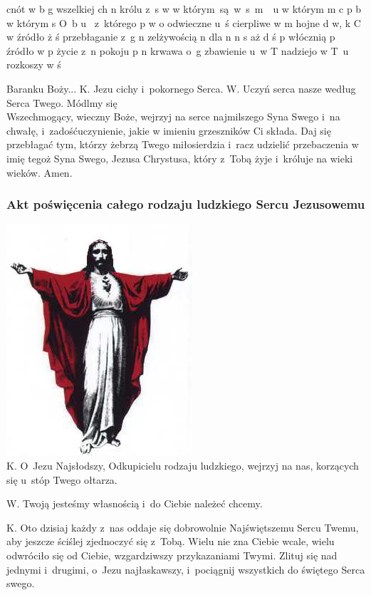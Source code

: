\documentclass[twocolumn,fleqn,oneside,openany,a5paper,12pt]{book}
\begin{document}
\sj cnót w b g
\sj wszelkiej ch n
\sj królu  z~s w
\sj w którym~są~w~s~m~~u
\sj w którym m c p b
\sj w którym s O~b u~
\sj z~którego p w o
\sj odwieczne u~ś
\sj cierpliwe  w m
\sj hojne d w, k C w
\sj źródło ż  ś
\sj przebłaganie z~g n
\sj zelżywością n
\sj dla n n s
\sj aż d ś p
\sj włócznią p
\sj źródło w p
\sj życie  z~n
\sj pokoju  p n
\sj krwawa o~g
\sj zbawienie u~w T
\sj nadziejo w T~u
\sj rozkoszy w ś
 
{\tiny Baranku Boży... 
K. Jezu cichy i~pokornego Serca.
W. Uczyń serca nasze według Serca Twego.}
\endgroup 
Módlmy się\\
Wszechmogący, wieczny Boże, wejrzyj na serce najmilszego Syna Swego i~na chwałę, i~zadośćuczynienie, jakie w imieniu grzeszników Ci składa. 
Daj się przebłagać tym, którzy żebrzą Twego miłosierdzia i~racz udzielić przebaczenia w imię tegoż Syna Swego, Jezusa Chrystusa, który z~Tobą żyje i~króluje na wieki wieków. Amen.
 
\subsubsection*{Akt poświęcenia całego rodzaju ludzkiego Sercu Jezusowemu}
\includegraphics[width=.4\textwidth]{SerceJezusa.jpg}\\
K. O~Jezu Najsłodszy, Odkupicielu rodzaju ludzkiego, wejrzyj na nas, korzących się u~stóp Twego ołtarza.

W. Twoją jesteśmy własnością i~do Ciebie należeć chcemy.

K. Oto dzisiaj każdy z~nas oddaje się dobrowolnie Najświętszemu Sercu Twemu, aby jeszcze ściślej zjednoczyć się z~Tobą. Wielu nie zna Ciebie wcale, wielu odwróciło się od Ciebie, wzgardziwszy przykazaniami Twymi. Zlituj się nad jednymi i~drugimi, o~Jezu najłaskawszy, i~pociągnij wszystkich do świętego Serca swego.
\end{document}
